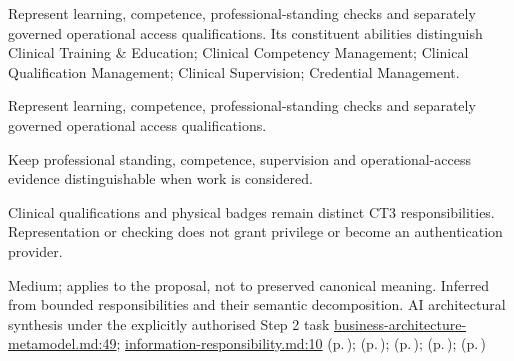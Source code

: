 Represent learning, competence, professional-standing checks and separately governed operational access qualifications. Its constituent abilities distinguish Clinical Training \& Education; Clinical Competency Management; Clinical Qualification Management; Clinical Supervision; Credential Management.



Represent learning, competence, professional-standing checks and separately governed operational access qualifications.



Keep professional standing, competence, supervision and operational-access evidence distinguishable when work is considered.



Clinical qualifications and physical badges remain distinct CT3 responsibilities. Representation or checking does not grant privilege or become an authentication provider.


Medium; applies to the proposal, not to preserved canonical meaning.
Inferred from bounded responsibilities and their semantic decomposition. AI architectural synthesis under the explicitly authorised Step 2 task \hyperref[evidence:4bac85accd34ce0b]{business-architecture-metamodel.md:49}; \hyperref[evidence:be61392fefb4bb10]{information-responsibility.md:10}
 (p.\,\pageref{cap:bec-clinical-training-education});  (p.\,\pageref{cap:bec-clinical-competency-management});  (p.\,\pageref{cap:bec-clinical-qualification-management});  (p.\,\pageref{cap:bec-clinical-supervision});  (p.\,\pageref{cap:bec-reviewed-credential-management})
